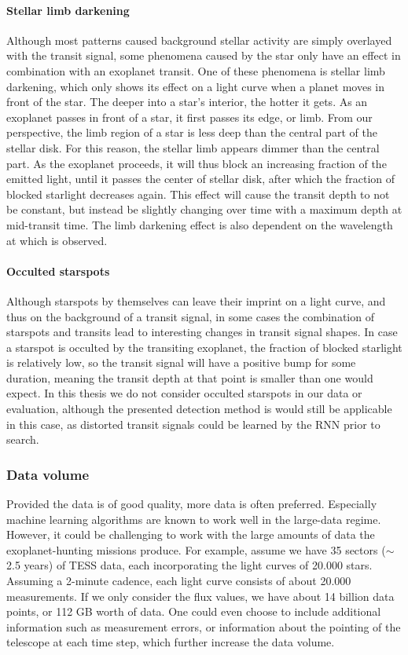 \paragraph{Stellar limb darkening}

Although most patterns caused background stellar activity are simply overlayed with the transit signal, some phenomena caused by the star only have an effect in combination with an exoplanet transit. One of these phenomena is stellar limb darkening, which only shows its effect on a light curve when a planet moves in front of the star. The deeper into a star's interior, the hotter it gets. As an exoplanet passes in front of a star, it first passes its edge, or limb. From our perspective, the limb region of a star is less deep than the central part of the stellar disk. For this reason, the stellar limb appears dimmer than the central part. As the exoplanet proceeds, it will thus block an increasing fraction of the emitted light, until it passes the center of stellar disk, after which the fraction of blocked starlight decreases again. This effect will cause the transit depth to not be constant, but instead be slightly changing over time with a maximum depth at mid-transit time. The limb darkening effect is also dependent on the wavelength at which is observed. 

\paragraph{Occulted starspots}

Although starspots by themselves can leave their imprint on a light curve, and thus on the background of a transit signal, in some cases the combination of starspots and transits lead to interesting changes in transit signal shapes. In case a starspot is occulted by the transiting exoplanet, the fraction of blocked starlight is relatively low, so the transit signal will have a positive bump for some duration, meaning the transit depth at that point is smaller than one would expect. In this thesis we do not consider occulted starspots in our data or evaluation, although the presented detection method is would still be applicable in this case, as distorted transit signals could be learned by the RNN prior to search.

\subsubsection{Data volume}

Provided the data is of good quality, more data is often preferred. Especially machine learning algorithms are known to work well in the large-data regime. However, it could be challenging to work with the large amounts of data the exoplanet-hunting missions produce. For example, assume we have 35 sectors ($\sim$2.5 years) of TESS data, each incorporating the light curves of 20.000 stars. Assuming a 2-minute cadence, each light curve consists of about 20.000 measurements. If we only consider the flux values, we have about 14 billion data points, or 112 GB worth of data. One could even choose to include additional information such as measurement errors, or information about the pointing of the telescope at each time step, which further increase the data volume.